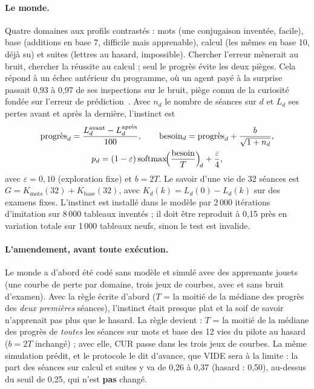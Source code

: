 \documentclass[11pt,a4paper]{article}
\begin{document}
\paragraph{Le monde.} Quatre domaines aux profils contrastés : \og mots \fg{} (une
conjugaison inventée, facile), \og base \fg{} (additions en base 7, difficile mais
apprenable), \og calcul \fg{} (les mêmes en base 10, déjà su) et \og suites \fg{}
(lettres au hasard, impossible). Chercher l'erreur mènerait au bruit, chercher la
réussite au calcul ; seul le progrès évite les deux pièges. Cela répond à un échec
antérieur du programme, où un agent payé à la surprise passait 0,93 à 0,97 de ses
inspections sur le bruit, piège connu de la curiosité fondée sur l'erreur de
prédiction~\cite{pathak2017,burda2019}. Avec $n_d$ le nombre de séances
sur $d$ et $L_d$ ses pertes avant et après la dernière, l'instinct est
\begin{equation}
\begin{gathered}
\text{progrès}_d=\frac{L^{\text{avant}}_d-L^{\text{après}}_d}{100},\qquad
\text{besoin}_d=\text{progrès}_d+\frac{b}{\sqrt{1+n_d}},\\
p_d=(1-\varepsilon)\operatorname{softmax}\!\Bigl(\frac{\text{besoin}}{T}\Bigr)_{\!d}+\frac{\varepsilon}{4},
\end{gathered}
\label{eq-instinct}
\end{equation}
avec $\varepsilon=0,10$ (exploration fixe) et $b=2T$. Le savoir d'une vie de 32
séances est $G=K_\text{mots}(32)+K_\text{base}(32)$, avec $K_d(k)=L_d(0)-L_d(k)$ sur
des examens fixes. L'instinct est installé dans le modèle par 2\,000 itérations
d'imitation sur 8\,000 tableaux inventés ; il doit être reproduit à 0,15 près en
variation totale sur 1\,000 tableaux neufs, sinon le test est invalide.

\paragraph{L'amendement, avant toute exécution.} Le monde a d'abord été codé sans
modèle et simulé avec des apprenants jouets (une courbe de perte par domaine, trois
jeux de courbes, avec et sans bruit d'examen). Avec la règle écrite d'abord ($T$ =
la moitié de la médiane des progrès des \emph{deux premières} séances), l'instinct
était presque plat et la soif de savoir n'apprenait pas plus que le hasard. La règle
devient : $T$ = la moitié de la médiane des progrès de \emph{toutes} les séances sur
\og mots \fg{} et \og base \fg{} des 12 vies du pilote au hasard ($b=2T$ inchangé) ;
avec elle, CUR passe dans les trois jeux de courbes. La même simulation prédit, et
le protocole le dit d'avance, que VIDE sera à la limite : la part des séances sur
\og calcul \fg{} et \og suites \fg{} y va de 0,26 à 0,37 (hasard : 0,50), au-dessus du
seuil de 0,25, qui n'est \textbf{pas} changé.
\end{document}
